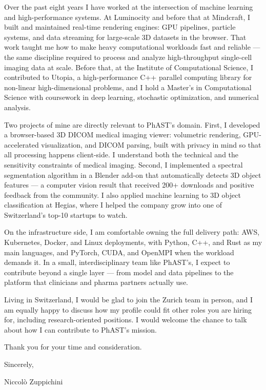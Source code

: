 Over the past eight years I have worked at the intersection of machine learning and high-performance systems. At Luminocity and before that at Mindcraft, I built and maintained real-time rendering engines: GPU pipelines, particle systems, and data streaming for large-scale 3D datasets in the browser. That work taught me how to make heavy computational workloads fast and reliable --- the same discipline required to process and analyze high-throughput single-cell imaging data at scale. Before that, at the Institute of Computational Science, I contributed to Utopia, a high-performance C++ parallel computing library for non-linear high-dimensional problems, and I hold a Master's in Computational Science with coursework in deep learning, stochastic optimization, and numerical analysis.

Two projects of mine are directly relevant to PhAST's domain. First, I developed a browser-based 3D DICOM medical imaging viewer: volumetric rendering, GPU-accelerated visualization, and DICOM parsing, built with privacy in mind so that all processing happens client-side. I understand both the technical and the sensitivity constraints of medical imaging. Second, I implemented a spectral segmentation algorithm in a Blender add-on that automatically detects 3D object features --- a computer vision result that received 200+ downloads and positive feedback from the community. I also applied machine learning to 3D object classification at Hegias, where I helped the company grow into one of Switzerland's top-10 startups to watch.

On the infrastructure side, I am comfortable owning the full delivery path: AWS, Kubernetes, Docker, and Linux deployments, with Python, C++, and Rust as my main languages, and PyTorch, CUDA, and OpenMPI when the workload demands it. In a small, interdisciplinary team like PhAST's, I expect to contribute beyond a single layer --- from model and data pipelines to the platform that clinicians and pharma partners actually use.

Living in Switzerland, I would be glad to join the Zurich team in person, and I am equally happy to discuss how my profile could fit other roles you are hiring for, including research-oriented positions. I would welcome the chance to talk about how I can contribute to PhAST's mission.

Thank you for your time and consideration.

\vspace{20pt}
Sincerely,

\vspace{25pt}
Niccol\`o Zuppichini


